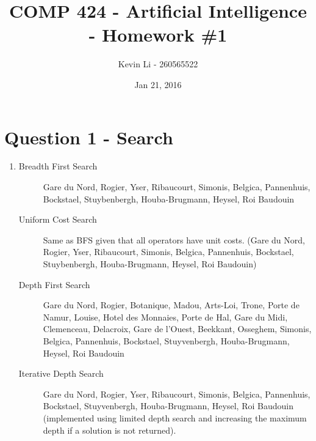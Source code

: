 \documentclass{article}
\title{COMP 424 - Artificial Intelligence - Homework \#1}
\author{Kevin Li - 260565522}
\date{Jan 21, 2016}
\begin{document}
\maketitle
\newpage

\section{Question 1 - Search}
\begin{enumerate}
\item %
    \begin{description}
        \item[Breadth First Search] Gare du Nord, Rogier, Yser,
            Ribaucourt, Simonis, Belgica, Pannenhuis, Bockstael,
            Stuybenbergh, Houba-Brugmann, Heysel, Roi Baudouin

        \item[Uniform Cost Search] Same as BFS given that all
            operators have unit costs.
            (Gare du Nord, Rogier, Yser, Ribaucourt, Simonis, Belgica, Pannenhuis, Bockstael, Stuybenbergh, Houba-Brugmann, Heysel, Roi Baudouin)

        \item[Depth First Search] Gare du Nord, Rogier, Botanique, Madou, Arts-Loi, Trone, Porte de Namur, Louise, Hotel des Monnaies, Porte de Hal, Gare du Midi, Clemenceau, Delacroix, Gare de l'Ouest, Beekkant, Osseghem, Simonis, Belgica, Pannenhuis, Bockstael, Stuyvenbergh, Houba-Brugmann, Heysel, Roi Baudouin

        \item[Iterative Depth Search] Gare du Nord, Rogier, Yser, Ribaucourt, Simonis, Belgica, Pannenhuis, Bockstael, Stuyvenbergh, Houba-Brugmann, Heysel, Roi Baudouin (implemented using limited depth search and increasing the maximum depth if a solution is not returned).
    \end{description}


\end{enumerate}
\end{document}
